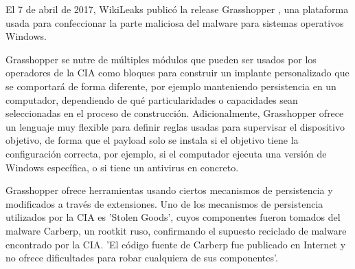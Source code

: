 El 7 de abril de 2017, WikiLeaks publicó la release Grasshopper \cite{grasshopper}, una plataforma usada para confeccionar la parte maliciosa del malware para sistemas operativos Windows. 

Grasshopper se nutre de múltiples módulos que pueden ser usados por los operadores de la CIA como bloques para construir un implante personalizado que se comportará de forma diferente, por ejemplo manteniendo persistencia en un computador, dependiendo de qué particularidades o capacidades sean seleccionadas en el proceso de construcción. Adicionalmente, Grasshopper ofrece un lenguaje muy flexible para definir reglas usadas para supervisar el dispositivo objetivo, de forma que el payload solo se instala si el objetivo tiene la configuración correcta, por ejemplo, si el computador ejecuta una versión de Windows específica, o si tiene un antivirus en concreto.

Grasshopper ofrece herramientas usando ciertos mecanismos de persistencia y modificados a través de extensiones. Uno de los mecanismos de persistencia utilizados por la CIA es 'Stolen Goods', cuyos componentes fueron tomados del malware Carberp,  un rootkit ruso, confirmando el supuesto reciclado de malware encontrado por la CIA. 'El código fuente de Carberp fue publicado en Internet y no ofrece dificultades para robar cualquiera de sus componentes'.
